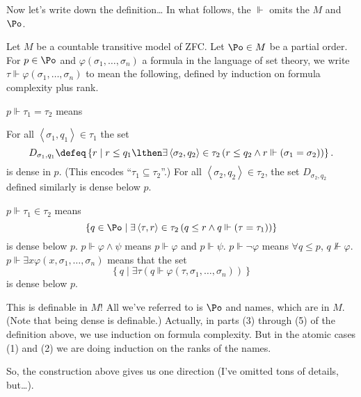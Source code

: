 Now let's write down the definition\dots
In what follows, the $\Vdash$ omits the $M$ and $\Po$.
\begin{definition}
	Let $M$ be a countable transitive model of ZFC.
	Let $\Po \in M$ be a partial order.
	For $p \in \Po$ and $\varphi(\sigma_1, \dots, \sigma_n)$
	a formula in the language of set theory,
	we write $\tau \Vdash \varphi(\sigma_1, \dots, \sigma_n)$
	to mean the following, defined by induction on formula complexity plus rank.
	\begin{enumerate}[(1)]
		\ii $p \Vdash \tau_1 = \tau_2$ means
		\begin{enumerate}[(i)]
			\ii For all $\left<\sigma_1, q_1\right> \in \tau_1$ the set
			\[ D_{\sigma_1, q_1}
				\defeq
				\left\{ r \mid
				r \le q_1 \lthen \exists \left<\sigma_2, q_2\right> \in \tau_2 \left( r \le q_2 \land r \Vdash (\sigma_1 = \sigma_2) \right)\right\}.
			\]
			is dense in $p$.
			(This encodes ``$\tau_1 \subseteq \tau_2$''.)
			\ii For all $\left<\sigma_2, q_2\right> \in \tau_2$,
			the set $D_{\sigma_2, q_2}$ defined similarly is dense below $p$.
		\end{enumerate}
		\ii $p \Vdash \tau_1 \in \tau_2$ means
		\[
		\left\{ q \in \Po
		\mid \exists \left<\tau, r\right> \in \tau_2
		\left( q \le r \land q \Vdash(\tau=\tau_1) \right)
		\right\} \]
		is dense below $p$.
		\ii $p \Vdash \varphi \land \psi$ means $p \Vdash \varphi$ and $p \Vdash \psi$.
		\ii $p \Vdash \neg \varphi$ means $\forall q \le p$, $q \not\Vdash \varphi$.
		\ii $p \Vdash \exists x \varphi(x, \sigma_1, \dots, \sigma_n)$ means that the set
		\[
			\left\{ q \mid \exists \tau \left( q \Vdash
				\varphi(\tau, \sigma_1, \dots, \sigma_n ) \right)
			\right\}
		\]
		is dense below $p$.
	\end{enumerate}
\end{definition}
This is definable in $M$!
All we've referred to is $\Po$ and names, which are in $M$.
(Note that being dense is definable.)
Actually, in parts (3) through (5) of the definition above,
we use induction on formula complexity.
But in the atomic cases (1) and (2) we are doing induction on the ranks of the names.

So, the construction above gives us one direction (I've omitted tons of details, but\dots).

